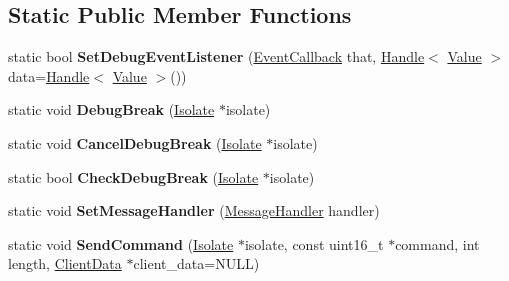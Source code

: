 \subsection*{Static Public Member Functions}
\begin{DoxyCompactItemize}
\item 
\hypertarget{classv8_1_1_debug_a745bc83ba29626b64151a1a3e9759e8a}{}static bool {\bfseries Set\+Debug\+Event\+Listener} (\hyperlink{classv8_1_1_debug_ab53894746a21222796062f0e81ea28d8}{Event\+Callback} that, \hyperlink{classv8_1_1_local}{Handle}$<$ \hyperlink{classv8_1_1_value}{Value} $>$ data=\hyperlink{classv8_1_1_local}{Handle}$<$ \hyperlink{classv8_1_1_value}{Value} $>$())\label{classv8_1_1_debug_a745bc83ba29626b64151a1a3e9759e8a}

\item 
\hypertarget{classv8_1_1_debug_a0c730ea558b1fc86cb728980c91a4c7c}{}static void {\bfseries Debug\+Break} (\hyperlink{classv8_1_1_isolate}{Isolate} $\ast$isolate)\label{classv8_1_1_debug_a0c730ea558b1fc86cb728980c91a4c7c}

\item 
\hypertarget{classv8_1_1_debug_a976a373dc06c146cdbe8d6f2fd7f57b5}{}static void {\bfseries Cancel\+Debug\+Break} (\hyperlink{classv8_1_1_isolate}{Isolate} $\ast$isolate)\label{classv8_1_1_debug_a976a373dc06c146cdbe8d6f2fd7f57b5}

\item 
\hypertarget{classv8_1_1_debug_aa564431664efa61d6d72c9cbd91b4ea2}{}static bool {\bfseries Check\+Debug\+Break} (\hyperlink{classv8_1_1_isolate}{Isolate} $\ast$isolate)\label{classv8_1_1_debug_aa564431664efa61d6d72c9cbd91b4ea2}

\item 
\hypertarget{classv8_1_1_debug_ab26a90abc5c21c752f6923a1986f0bb7}{}static void {\bfseries Set\+Message\+Handler} (\hyperlink{classv8_1_1_debug_a526826b857bd3e3efa184e12bcebc694}{Message\+Handler} handler)\label{classv8_1_1_debug_ab26a90abc5c21c752f6923a1986f0bb7}

\item 
\hypertarget{classv8_1_1_debug_aba2426f25ee7cd31659426287777bb00}{}static void {\bfseries Send\+Command} (\hyperlink{classv8_1_1_isolate}{Isolate} $\ast$isolate, const uint16\+\_\+t $\ast$command, int length, \hyperlink{classv8_1_1_debug_1_1_client_data}{Client\+Data} $\ast$client\+\_\+data=N\+U\+L\+L)\label{classv8_1_1_debug_aba2426f25ee7cd31659426287777bb00}


\end{DoxyCompactItemize}
